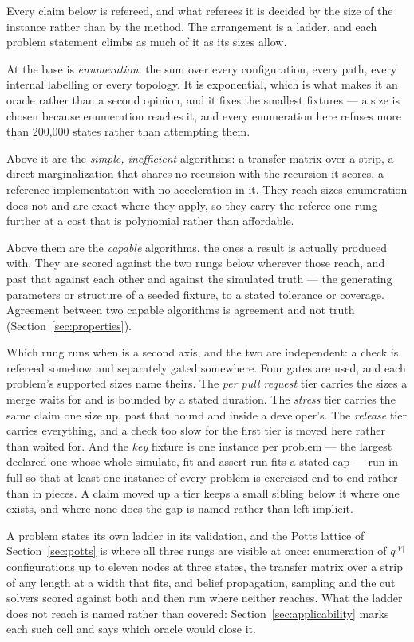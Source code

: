\documentclass[11pt,a4paper]{article}
\begin{document}
Every claim below is refereed, and what referees it is decided by the size of
the instance rather than by the method. The arrangement is a ladder, and each
problem statement climbs as much of it as its sizes allow.

At the base is \emph{enumeration}: the sum over every configuration, every
path, every internal labelling or every topology. It is exponential, which is
what makes it an oracle rather than a second opinion, and it fixes the
smallest fixtures --- a size is chosen because enumeration reaches it, and
every enumeration here refuses more than 200,000 states rather than attempting
them.

Above it are the \emph{simple, inefficient} algorithms: a transfer matrix over
a strip, a direct marginalization that shares no recursion with the recursion
it scores, a reference implementation with no acceleration in it. They reach
sizes enumeration does not and are exact where they apply, so they carry the
referee one rung further at a cost that is polynomial rather than affordable.

Above them are the \emph{capable} algorithms, the ones a result is actually
produced with. They are scored against the two rungs below wherever those
reach, and past that against each other and against the simulated truth --- the
generating parameters or structure of a seeded fixture, to a stated tolerance
or coverage. Agreement between two capable algorithms is agreement and not
truth (Section~\ref{sec:properties}).

Which rung runs when is a second axis, and the two are independent: a check
is refereed somehow and separately gated somewhere. Four gates are used, and
each problem's supported sizes name theirs. The \emph{per pull request} tier
carries the sizes a merge waits for and is bounded by a stated duration. The
\emph{stress} tier carries the same claim one size up, past that bound and
inside a developer's. The \emph{release} tier carries everything, and a check
too slow for the first tier is moved here rather than waited for. And the
\emph{key} fixture is one instance per problem --- the largest declared one
whose whole simulate, fit and assert run fits a stated cap --- run in full so
that at least one instance of every problem is exercised end to end rather
than in pieces. A claim moved up a tier keeps a small sibling below it where
one exists, and where none does the gap is named rather than left implicit.

A problem states its own ladder in its validation, and the Potts lattice of
Section~\ref{sec:potts} is where all three rungs are visible at once:
enumeration of $q^{|V|}$ configurations up to eleven nodes at three states,
the transfer matrix over a strip of any length at a width that fits, and
belief propagation, sampling and the cut solvers scored against both and then
run where neither reaches. What the ladder does not reach is named rather than
covered: Section~\ref{sec:applicability} marks each such cell and says which
oracle would close it.
\end{document}
